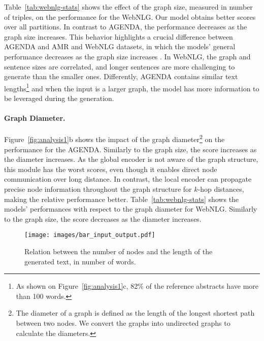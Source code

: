 \documentclass[11pt,a4paper]{article}
\begin{document}
Table~\ref{tab:webnlg-stats} shows the effect of the graph size, measured in number of triples, on the performance for the WebNLG. Our model obtains better scores over all partitions. In contrast to AGENDA, the performance decreases as the graph size increases. This behavior highlights a crucial difference between AGENDA and AMR and WebNLG datasets, in which the models' general performance decreases as the graph size increases \cite{gardent-etal-2017-webnlg,cai-lam-2020-graph}. In WebNLG, the graph and sentence sizes are correlated, and longer sentences are more challenging to generate than the smaller ones. Differently, AGENDA contains similar text lengths\footnote{As shown on Figure~\ref{fig:analysis1}c, 82\% of the reference abstracts have more than 100 words.} and when the input is a larger graph, the model has more information to be leveraged during the generation. 













\paragraph{Graph Diameter.} Figure~\ref{fig:analysis1}b shows the impact of the graph diameter\footnote{The diameter of a graph is defined as the length of the longest shortest path between two nodes. We convert the graphs into undirected graphs to calculate the diameters.} on the performance for the AGENDA. Similarly to the graph size, the score increases as the diameter increases. As the global encoder is not aware of the graph structure, this module has the worst scores, even though it enables direct node communication over long distance. In contrast, the local encoder can propagate precise node information throughout the graph structure for $k$-hop distances, making the relative performance better. Table~\ref{tab:webnlg-stats} shows the models' performances with respect to the graph diameter for WebNLG. Similarly to the graph size, the score decreases as the diameter increases.


 \begin{figure}[t]
    \centering
    \texttt{[image: images/bar\_input\_output.pdf]}
    \vspace{-3mm}
    \caption{Relation between the number of nodes and the length of the generated text, in number of words.}
    \label{fig:comparison-input-output}
\end{figure}
\end{document}
